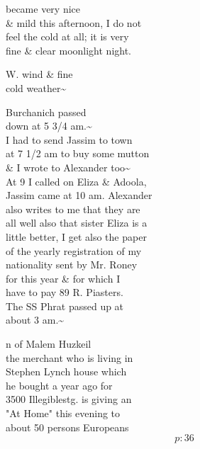 \documentclass{report}
\begin{document}


	\par{
 	became very nice\ \\\& mild this afternoon, I do not\ \\feel the cold at all; it is very\ \\fine \& clear moonlight night.\ \\
	}


	\par{
 	W. wind \& fine\ \\cold weather\~{}\ \\
	}

	\par{
 	Burchanich passed\ \\down at 5 3/4 am.\~{}\ \\I had to send Jassim to town\ \\at 7 1/2 am to buy some mutton\ \\\& I wrote to Alexander too\~{}\ \\At 9 I called on Eliza \& Adoola,\ \\Jassim came at 10 am. Alexander\ \\also writes to me that they are\ \\all well also that sister Eliza is a\ \\little better, I get also the paper\ \\of the yearly registration of my\ \\nationality sent by Mr. Roney\ \\for this year \& for which I\ \\have to pay 89 R. Piasters.\ \\The SS Phrat passed up at\ \\about 3 am.\~{}\ \\
	}

	\par{
 	n of Malem Huzkeil\ \\the merchant who is living in\ \\Stephen Lynch house which\ \\he bought a year ago for\ \\3500 \lbrack Illegible\rbrack stg. is giving an\ \\"At Home" this evening to\ \\about 50 persons Europeans\ \\
  \[p: 36 \]

	}
\end{document}
